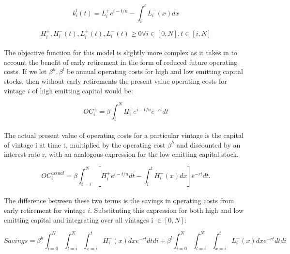 \documentclass{easychithesis}
\begin{document}
\begin{equation}
k_i^l(t) = L_i^+ e^{i-t/n} - \int_i^t L^-_i(x)dx
\end{equation}

\begin{equation}
H^+_i, H^-_i(t), L^+_i(t), L^-_i(t) \geq 0 \forall i \in [0,N], t \in [i,N]
\end{equation}


\paragraph{} The objective function for this model is slightly more complex as it takes in to account the benefit of early retirement in the form of reduced future operating costs. If we let $\beta^h, \beta^l$ be annual operating costs for high and low emitting capital stocks, then without early retirements the present value operating costs for vintage $i$ of high emitting capital would be:

\begin{equation}
OC^+_i=\beta \int_i^N H_i^+e^{i-t/n}e^{-rt}dt
\end{equation}

\paragraph{} The actual present value of operating costs for a particular vintage is the capital of vintage i at time t, multiplied by the operating cost $\beta^h$ and discounted by an interest rate r, with an analogous expression for the low emitting capital stock. 

\begin{equation}
OC^{actual}_i=\beta \int_{t=i}^N \left[H_i^+e^{i-t/n}dt -\int_i^tH_i^-(x)dx\right] e^{-rt}dt.
\end{equation}

\paragraph{} The difference between these two terms is the savings in operating costs from early retirement for vintage $i$. Substituting this expression for both high and low emitting capital and integrating over all vintages  i $\in [0,N]$:

\begin{equation}
Savings = \beta^h \int_{i=0}^N \int_{t=i}^N \int_{x=i}^t H^-_i(x) dx e^{-rt} dt di + \beta^l \int_{i=0}^N \int_{t=i}^N\int_{x=i}^t L_i^-(x) dx e^{-rt} dt di
\end{equation}
\end{document}
